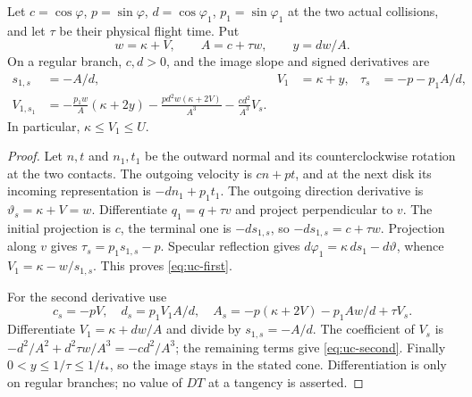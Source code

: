 \begin{lemma}\label{lem:uc-transform}
Let $c=\cos\varphi$, $p=\sin\varphi$, $d=\cos\varphi_1$,
$p_1=\sin\varphi_1$ at the two actual collisions, and let $\tau$ be their
physical flight time. Put
\begin{equation}\label{eq:uc-wa}
 w=\kappa+V,\qquad A=c+\tau w,\qquad y=dw/A.
\end{equation}
On a regular branch, $c,d>0$, and the image slope and signed derivatives are
\begin{align}
 s_{1,s}&=-A/d,& V_1&=\kappa+y, &
 \tau_s&=-p-p_1 A/d,\label{eq:uc-first}\\
 V_{1,s_1}
 &=-\frac{p_1w}{A}(\kappa+2y)
   -\frac{pd^2w(\kappa+2V)}{A^3}
   -\frac{cd^2}{A^3}V_s.\label{eq:uc-second}
\end{align}
In particular, $\kappa\le V_1\le U$.
\end{lemma}
\begin{proof}
Let $n,t$ and $n_1,t_1$ be the outward normal and its counterclockwise
rotation at the two contacts. The outgoing velocity is $cn+pt$, and
at the next disk its incoming representation is $-dn_1+p_1t_1$.
The outgoing direction derivative is $\vartheta_s=\kappa+V=w$.
Differentiate $q_1=q+\tau v$ and project perpendicular to $v$.
The initial projection is $c$, the terminal one is $-d s_{1,s}$,
so $-d s_{1,s}=c+\tau w$. Projection along $v$ gives
$\tau_s=p_1s_{1,s}-p$. Specular reflection gives
$d\varphi_1=\kappa\,ds_1-d\vartheta$, whence
$V_1=\kappa-w/s_{1,s}$. This proves \eqref{eq:uc-first}.

For the second derivative use
\[
 c_s=-pV,\quad d_s=p_1V_1A/d,\quad
 A_s=-p(\kappa+2V)-p_1Aw/d+\tau V_s.
\]
Differentiate $V_1=\kappa+dw/A$ and divide by $s_{1,s}=-A/d$.
The coefficient of $V_s$ is
$-d^2/A^2+d^2\tau w/A^3=-cd^2/A^3$; the remaining terms give
\eqref{eq:uc-second}. Finally $0<y\le1/\tau\le1/t_*$,
so the image stays in the stated cone. Differentiation is only on
regular branches; no value of $DT$ at a tangency is asserted.
\end{proof}

